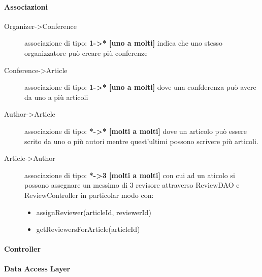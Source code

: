 \paragraph{Associazioni}
\begin{description}
\item [Organizer->Conference] associazione di tipo: \textbf{1->* [uno a molti]} indica che uno stesso organizzatore può creare più conferenze
\item [Conference->Article] associazione di tipo: \textbf{1->* [uno a molti]} dove una confderenza può avere da uno a più articoli
\item [Author->Article] associazione di tipo: \textbf{*->* [molti a molti]} dove un articolo può essere scrito da uno o più autori mentre quest'ultimi possono scrivere più articoli.
\item [Article->Author] associazione di tipo: \textbf{*->3 [molti a molti]} con cui ad un aticolo si possono assegnare un messimo di 3 revisore attraverso ReviewDAO e ReviewController in particolar modo con:
\begin{itemize}
 \item assignReviewer(articleId, reviewerId)
\item getReviewersForArticle(articleId)
\end{itemize}
\end{description}

\paragraph{Controller}
\begin{description}
\end{description}

\paragraph{Data Access Layer}
\begin{description}
\end{description}

